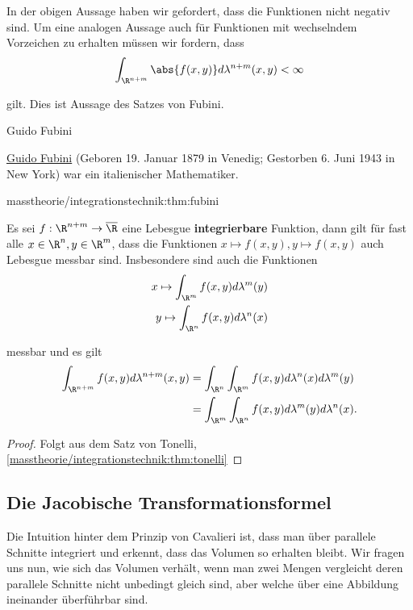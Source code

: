 \documentclass[letterpaper,10pt,german]{jupyterBook}
\begin{document}
\par
In der obigen Aussage haben wir gefordert, dass die Funktionen nicht negativ sind. Um eine analogen Aussage auch für Funktionen mit wechselndem Vorzeichen zu erhalten müssen wir fordern, dass
\begin{align*}
\int_{\R^{n+m}} \abs{f(x,y)} d\lambda^{n+m}(x,y) <\infty
\end{align*}
\par
gilt. Dies ist Aussage des Satzes von Fubini.

\begin{emphBox}{Guido Fubini}{}

\par
\href{https://de.wikipedia.org/wiki/Guido\_Fubini}{Guido Fubini} (Geboren 19. Januar 1879 in Venedig; Gestorben 6. Juni 1943 in New York) war ein italienischer Mathematiker.
\end{emphBox}
\begin{theorem}{}{masstheorie/integrationstechnik:thm:fubini}



\par
Es sei \(f:\R^{n+m}\to \overline{\R}\) eine Lebesgue \textbf{integrierbare} Funktion, dann gilt für fast alle \(x\in\R^n,y\in\R^m\), dass die Funktionen \(x\mapsto f(x,y), y\mapsto f(x,y)\) auch Lebesgue messbar sind. Insbesondere sind auch die Funktionen
\begin{align*}
x \mapsto \int_{\R^m} f(x,y) d\lambda^m(y)\\
y \mapsto \int_{\R^n} f(x,y) d\lambda^n(x)
\end{align*}
\par
messbar und es gilt
\begin{align*}
\int_{\R^{n+m}} f(x,y) d\lambda^{n+m}(x,y) &= \int_{\R^n}\int_{\R^m} f(x,y) d\lambda^{n}(x)d\lambda^m(y)\\
&=
\int_{\R^m}\int_{\R^n} f(x,y) d\lambda^{m}(y)d\lambda^n(x).
\end{align*}\end{theorem}

\begin{proof}
 Folgt aus dem Satz von Tonelli, \cref{masstheorie/integrationstechnik:thm:tonelli} 
\end{proof}


\subsection{Die Jacobische Transformationsformel}
\label{\detokenize{masstheorie/integrationstechnik:die-jacobische-transformationsformel}}
\par
Die Intuition hinter dem Prinzip von Cavalieri ist, dass man über parallele Schnitte integriert und erkennt, dass das Volumen so erhalten bleibt. Wir fragen uns nun, wie sich das Volumen verhält, wenn man zwei Mengen vergleicht deren parallele Schnitte nicht unbedingt gleich sind, aber welche über eine Abbildung ineinander überführbar sind.
\end{document}
